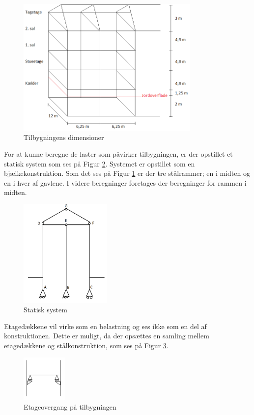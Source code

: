 \begin{figure}[H]
	\centering
	\includegraphics[width=0.8\textwidth]{billeder/tilbygning2.png}
	\caption{Tilbygningens dimensioner}
	\label{fig:farvel}
\end{figure}

For at kunne beregne de laster som påvirker tilbygningen, er der opstillet et statisk system som ses på Figur \ref{fig:system}. Systemet er opstillet som en bjælkekonstruktion. Som det ses på Figur \ref{fig:farvel} er der tre stålrammer; en i midten og en i hver af gavlene. I videre beregninger foretages der beregninger for rammen i midten.

\begin{figure}[H]
	\centering
	\includegraphics[width=0.4\textwidth]{billeder/del1statiskesystem.png}
	\caption{Statisk system}
	\label{fig:system}
\end{figure}

Etagedækkene vil virke som en belastning og ses ikke som en del af konstruktionen. Dette er muligt, da der opsættes en samling mellem etagedækkene og stålkonstruktion, som ses på Figur \ref{fig:etage}.

\begin{figure}[H]
	\centering
	\includegraphics[width=0.2\textwidth]{billeder/etageovergang.png}
	\caption{Etageovergang på tilbygningen}
	\label{fig:etage}
\end{figure}

